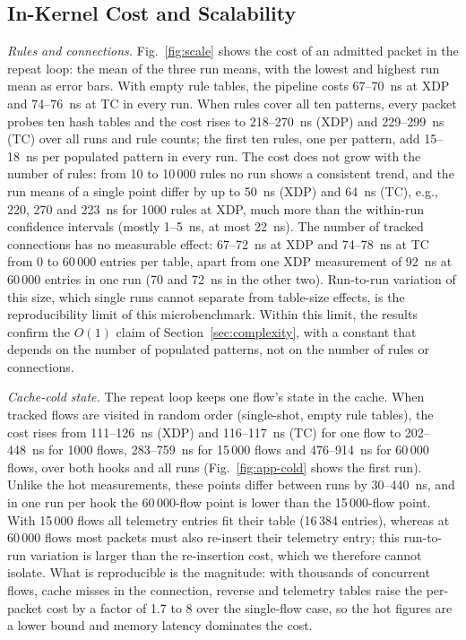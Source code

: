 \documentclass[conference]{IEEEtran}
\begin{document}
\subsection{In-Kernel Cost and Scalability}
\label{sec:kernel-cost}
\textit{Rules and connections.} Fig.~\ref{fig:scale} shows the cost of an
admitted packet in the repeat loop: the mean of the three run means, with the
lowest and highest run mean as error bars. With empty rule tables, the
pipeline costs 67--70~ns at XDP and 74--76~ns at TC in every run. When rules
cover all ten patterns, every packet probes ten hash tables and the cost
rises to 218--270~ns (XDP) and 229--299~ns (TC) over all runs and rule
counts; the first ten rules, one per pattern, add 15--18~ns per populated
pattern in every run. The cost does not grow with the number of rules: from
10 to 10\,000 rules no run shows a consistent trend, and the run means of a
single point differ by up to 50~ns (XDP) and 64~ns (TC), e.g., 220, 270 and
223~ns for 1000 rules at XDP, much more than the within-run confidence
intervals (mostly 1--5~ns, at most 22~ns). The number of tracked connections has no
measurable effect: 67--72~ns at XDP and 74--78~ns at TC from 0 to 60\,000
entries per table, apart from one XDP measurement of 92~ns at 60\,000 entries
in one run (70 and 72~ns in the other two). Run-to-run variation of this
size, which single runs cannot separate from table-size effects, is the
reproducibility limit of this microbenchmark. Within this limit, the results
confirm the $O(1)$ claim of Section~\ref{sec:complexity}, with a constant
that depends on the number of populated patterns, not on the number of rules
or connections.

\textit{Cache-cold state.} The repeat loop keeps one flow's state in the
cache. When tracked flows are visited in random order (single-shot, empty
rule tables), the cost rises from 111--126~ns (XDP) and 116--117~ns (TC) for
one flow to 202--448~ns for 1000 flows, 283--759~ns for 15\,000 flows and
476--914~ns for 60\,000 flows, over both hooks and all runs
(Fig.~\ref{fig:app-cold} shows the first run). Unlike the hot measurements,
these points differ between runs by 30--440~ns, and in one run per hook the
60\,000-flow point is lower than the 15\,000-flow point. With 15\,000 flows
all telemetry entries fit their table (16\,384 entries), whereas at 60\,000
flows most packets must also re-insert their telemetry entry; this
run-to-run variation is larger than the re-insertion cost, which we
therefore cannot isolate. What is reproducible is the magnitude: with
thousands of concurrent flows, cache misses in the connection, reverse and
telemetry tables raise the per-packet cost by a factor of 1.7 to 8 over the
single-flow case, so the hot figures are a lower bound and memory latency
dominates the cost.
\end{document}
